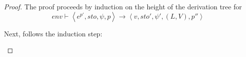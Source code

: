 \documentclass[../../../master.tex]{subfiles}
\begin{document}
\begin{proof}
	The proof proceeds by induction on the height of the derivation tree for 
	$$env\vdash\left\langle e^{p'},sto,\psi,p\right\rangle\rightarrow\left\langle v,sto',\psi',(L,V),p''\right\rangle$$
	\begin{description}
		\item[]

		\item[]
	\end{description}

	Next, follows the induction step:
	\begin{description}
		\item[]
		
		\item[]

		\item[]

		\item[]

		\item[]

		\item[]

		\item[]

		\item[]

		\item[]

		\item[]
	\end{description}
\end{proof}
\end{document}

